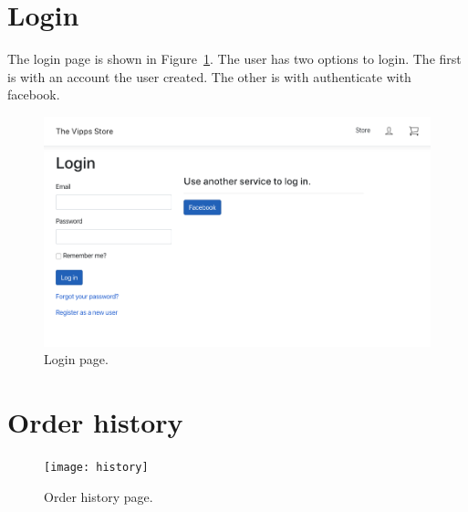 \documentclass[11pt,a4paper,english]{article}
\begin{document}
\section*{Login}
The login page is shown in Figure~\ref{fig:login}. The user has two options to login. The first is with an account the user created. The other is with authenticate with facebook.
\begin{figure}[htbp]
  \centering
  \includegraphics[scale=0.3]{login}
  \caption{Login page.}
  \label{fig:login}
\end{figure}
\section*{Order history}
\begin{figure}[htbp]
  \centering
  \texttt{[image: history]}
  \caption{Order history page.}
  \label{fig:history}
\end{figure}
\end{document}
